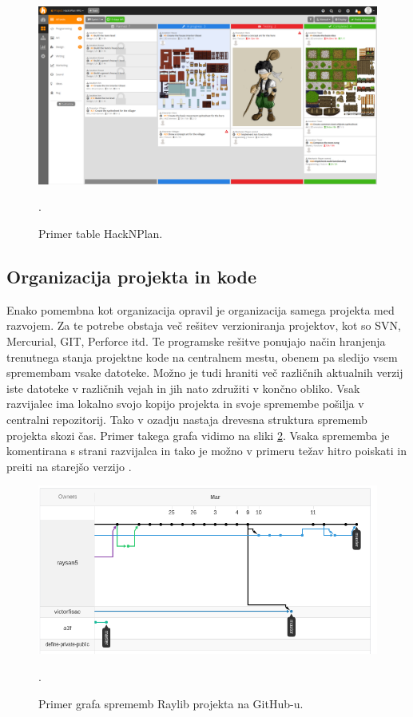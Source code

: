 \documentclass[12pt,a4paper,twoside]{book}
\begin{document}
\begin{figure}[h]
	\centering
	\includegraphics[width=13cm]{hacknplanDemo}
	\caption{Primer table HackNPlan.}.
	\label{slika:hacknplanDemo}
	\vspace*{-2em}
\end{figure}

\subsection{Organizacija projekta in kode}
Enako pomembna kot organizacija opravil je organizacija samega projekta med razvojem. Za te potrebe obstaja več rešitev verzioniranja projektov, kot so SVN, Mercurial, GIT, Perforce itd. Te programske rešitve ponujajo način hranjenja trenutnega stanja projektne kode na centralnem mestu, obenem pa sledijo vsem spremembam vsake datoteke. Možno je tudi hraniti več različnih aktualnih verzij iste datoteke v različnih vejah in jih nato združiti v končno obliko. Vsak razvijalec ima lokalno svojo kopijo projekta in svoje spremembe pošilja v centralni repozitorij. Tako v ozadju nastaja drevesna struktura sprememb projekta skozi čas. Primer takega grafa vidimo na sliki \ref{slika:gitGraph}. Vsaka sprememba je komentirana s strani razvijalca in tako je možno v primeru težav hitro poiskati in preiti na starejšo verzijo \cite{versionControl}.
	
\begin{figure}[h]
	\centering
	\includegraphics[width=13cm]{gitGraph}
	\caption{Primer grafa sprememb Raylib projekta na GitHub-u.}.
	\label{slika:gitGraph}
	\vspace*{-2em}
\end{figure}
\end{document}
